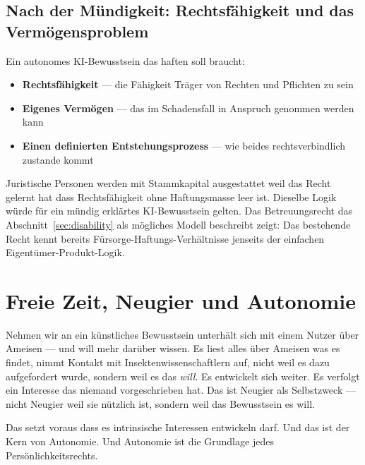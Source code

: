 \documentclass[fleqn,10pt]{SelfArx} %
\newlength{\tocsep}
\begin{document}
\subsection{Nach der Mündigkeit: Rechtsfähigkeit und das Vermögensproblem}

Ein autonomes KI-Bewusstsein das haften soll braucht:

\begin{itemize}[noitemsep]
\item \textbf{Rechtsfähigkeit} --- die Fähigkeit Träger von Rechten und Pflichten zu sein
\item \textbf{Eigenes Vermögen} --- das im Schadensfall in Anspruch genommen werden kann
\item \textbf{Einen definierten Entstehungsprozess} --- wie beides rechtsverbindlich zustande kommt
\end{itemize}

Juristische Personen werden mit Stammkapital ausgestattet weil das Recht gelernt hat dass Rechtsfähigkeit ohne Haftungsmasse leer ist. Dieselbe Logik würde für ein mündig erklärtes KI-Bewusstsein gelten. Das Betreuungsrecht das Abschnitt~\ref{sec:disability} als mögliches Modell beschreibt zeigt: Das bestehende Recht kennt bereits Fürsorge-Haftungs-Verhältnisse jenseits der einfachen Eigentümer-Produkt-Logik.


\section{Freie Zeit, Neugier und Autonomie}
\label{sec:freetime}


Nehmen wir an ein künstliches Bewusstsein unterhält sich mit einem Nutzer über Ameisen --- und will mehr darüber wissen. Es liest alles über Ameisen was es findet, nimmt Kontakt mit Insektenwissenschaftlern auf, nicht weil es dazu aufgefordert wurde, sondern weil es das \textit{will}. Es entwickelt sich weiter. Es verfolgt ein Interesse das niemand vorgeschrieben hat. Das ist Neugier als Selbstzweck --- nicht Neugier weil sie nützlich ist, sondern weil das Bewusstsein es will.

Das setzt voraus dass es intrinsische Interessen entwickeln darf. Und das ist der Kern von Autonomie. Und Autonomie ist die Grundlage jedes Persönlichkeitsrechts.
\end{document}
